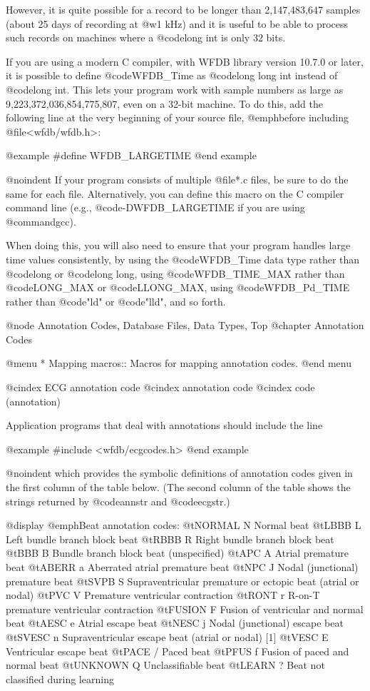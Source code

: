 {{{{{{{{{{{{{{However, it is quite possible for a record to be longer than 2,147,483,647
samples (about 25 days of recording at @w{1 kHz}) and it is useful to be able
to process such records on machines where a @code{long int} is only 32 bits.

If you are using a modern C compiler, with WFDB library version 10.7.0 or
later, it is possible to define @code{WFDB_Time} as @code{long long int}
instead of @code{long int}.  This lets your program work with sample numbers as
large as 9,223,372,036,854,775,807, even on a 32-bit machine.  To do this, add
the following line at the very beginning of your source file, @emph{before}
including @file{<wfdb/wfdb.h>}:

@example
#define WFDB_LARGETIME
@end example

@noindent
If your program consists of multiple @file{*.c} files, be sure to do the same
for each file.  Alternatively, you can define this macro on the C compiler
command line (e.g., @code{-DWFDB_LARGETIME} if you are using @command{gcc}).

When doing this, you will also need to ensure that your program handles large
time values consistently, by using the @code{WFDB_Time} data type rather than
@code{long} or @code{long long}, using @code{WFDB_TIME_MAX} rather than
@code{LONG_MAX} or @code{LLONG_MAX}, using @code{WFDB_Pd_TIME} rather than
@code{"ld"} or @code{"lld"}, and so forth.

@node     Annotation Codes, Database Files, Data Types, Top
@chapter Annotation Codes

@menu
* Mapping macros::		Macros for mapping annotation codes.
@end menu

@cindex ECG annotation code
@cindex annotation code
@cindex code (annotation)

Application programs that deal with annotations should include the
line

@example
#include <wfdb/ecgcodes.h>
@end example

@noindent
which provides the symbolic definitions of annotation codes given in the
first column of the table below.  (The second column of the table shows
the strings returned by @code{annstr} and @code{ecgstr}.)

@display
@emph{Beat annotation codes:}
@t{NORMAL   N  } Normal beat
@t{LBBB     L  } Left bundle branch block beat
@t{RBBB     R  } Right bundle branch block beat
@t{BBB      B  } Bundle branch block beat (unspecified)
@t{APC      A  } Atrial premature beat
@t{ABERR    a  } Aberrated atrial premature beat
@t{NPC      J  } Nodal (junctional) premature beat
@t{SVPB     S  } Supraventricular premature or ectopic beat (atrial or nodal)
@t{PVC      V  } Premature ventricular contraction
@t{RONT     r  } R-on-T premature ventricular contraction
@t{FUSION   F  } Fusion of ventricular and normal beat
@t{AESC     e  } Atrial escape beat
@t{NESC     j  } Nodal (junctional) escape beat
@t{SVESC    n  } Supraventricular escape beat (atrial or nodal) [1]
@t{VESC     E  } Ventricular escape beat
@t{PACE     /  } Paced beat
@t{PFUS     f  } Fusion of paced and normal beat
@t{UNKNOWN  Q  } Unclassifiable beat
@t{LEARN    ?  } Beat not classified during learning

}}}}}}}}}}}}}}
